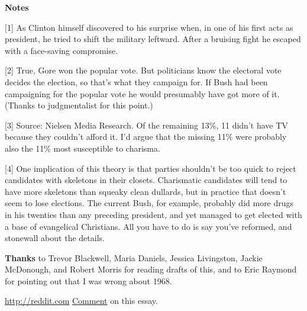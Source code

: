 \textbf{Notes}

[1] As Clinton himself discovered to his surprise when, in one
                  of his first acts as president, he tried to shift the military
                  leftward. After a bruising fight he escaped with a face-saving
                  compromise.

[2] True, Gore won the popular vote. But politicians know the
                  electoral vote decides the election, so that's what they
                  campaign for. If Bush had been campaigning for the popular
                  vote he would presumably have got more of it. (Thanks to
                  judgmentalist for this point.)

[3] Source: Nielsen Media Research. Of the remaining 13\%, 11
                  didn't have TV because they couldn't afford it. I'd argue that
                  the missing 11\% were probably also the 11\% most susceptible to
                  charisma.

[4] One implication of this theory is that parties shouldn't be
                  too quick to reject candidates with skeletons in their
                  closets. Charismatic candidates will tend to have more
                  skeletons than squeaky clean dullards, but in practice that
                  doesn't seem to lose elections. The current Bush, for example,
                  probably did more drugs in his twenties than any preceding
                  president, and yet managed to get elected with a base of
                  evangelical Christians. All you have to do is say you've
                  reformed, and stonewall about the details.

\textbf{Thanks}
                  to Trevor Blackwell, Maria Daniels, Jessica Livingston, Jackie
                  McDonough, and Robert Morris for reading drafts of this, and
                  to Eric Raymond for pointing out that I was wrong about
                  1968.


                  \href{http://reddit.com}{http://reddit.com}
                  \href{http://reddit.com/info/8zp7/comments}{ Comment} on
                  this essay.



              
            
          
